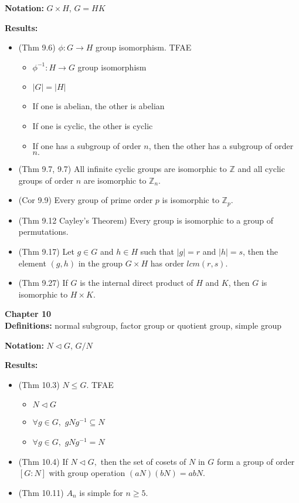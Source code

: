 \documentclass[12pt]{article}
\newcommand{\bbZ}{\mathbb{Z}}
\begin{document}
\noindent \textbf{Notation:} $G \times H$, $G=HK$

\noindent \textbf{Results:}
	\begin{itemize}
	\item (Thm 9.6) $\phi: G \to H$ group isomorphism. TFAE
		\begin{itemize}
		\item $\phi^{-1}: H \to G$ group isomorphism
		\item $|G|=|H|$
		\item If one is abelian, the other is abelian
		\item If one is cyclic, the other is cyclic
		\item If one has a subgroup of order $n$, then the other has a subgroup of order $n.$
		\end{itemize}
	\item (Thm 9.7, 9.7) All infinite cyclic groups are isomorphic to $\bbZ$ and all cyclic groups of order $n$ are isomorphic to $\bbZ_n.$
	\item (Cor 9.9) Every group of prime order $p$ is isomorphic to $\bbZ_p.$
	\item (Thm 9.12 Cayley's Theorem) Every group is isomorphic to a group of permutations.
	\item (Thm 9.17) Let $g \in G$ and $h \in H$ such that $|g|=r$ and $|h|=s$, then the element $(g,h)$ in the group $G \times H$ has order $lcm(r,s).$
	\item (Thm 9.27) If $G$ is the internal direct product of $H$ and $K$, then $G$ is isomorphic to $H \times K.$
	\end{itemize}

\noindent \textbf{Chapter 10}\\

\noindent \textbf{Definitions:} normal subgroup, factor group or quotient group, simple group

\noindent \textbf{Notation:} $N \lhd G$, $G/N$

\noindent \textbf{Results:}
	\begin{itemize}
	\item (Thm 10.3) $N \leq G$. TFAE
		\begin{itemize}
		\item $N \lhd G$
		\item $\forall g \in G,$ $gNg^{-1} \subseteq N$
		\item $\forall g \in G,$ $gNg^{-1} = N$
		\end{itemize}
	\item (Thm 10.4) If $N \lhd G,$ then the set of cosets of $N$ in $G$ form a group of order $[G:N]$ with group operation $(aN)(bN)=abN.$
	\item (Thm 10.11) $A_n$ is simple for $n \geq 5.$
	\end{itemize}
\end{document}
